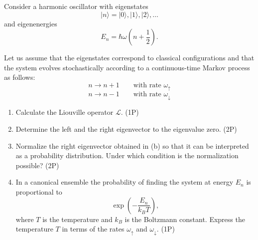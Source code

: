\begin{Problem}
	
	Consider a harmonic oscillator with eigenstates
	\[
	|n\rangle = |0\rangle, |1\rangle, |2\rangle, \ldots
	\]
	and eigenenergies
	\[
	E_n = \hbar \omega \left(n+\frac12\right).
	\]
	
	Let us assume that the eigenstates correspond to classical configurations and that
	the system evolves stochastically according to a continuous-time Markov process as follows:
	\[
	n \to n+1 \qquad \text{with rate } \omega_\uparrow
	\]
	\[
	n \to n-1 \qquad \text{with rate } \omega_\downarrow
	\]
	
	\begin{enumerate}[label=(\alph*)]
		\item Calculate the Liouville operator $\mathcal{L}$. \hfill (1P)
		
		\item Determine the left and the right eigenvector to the eigenvalue zero. \hfill (2P)
		
		\item Normalize the right eigenvector obtained in (b) so that it can be interpreted
		as a probability distribution. Under which condition is the normalization possible?
		\hfill (2P)
		
		\item In a canonical ensemble the probability of finding the system at energy $E_n$
		is proportional to
		\[
		\exp\!\left(-\frac{E_n}{k_B T}\right),
		\]
		where $T$ is the temperature and $k_B$ is the Boltzmann constant.
		Express the temperature $T$ in terms of the rates
		$\omega_\uparrow$ and $\omega_\downarrow$. \hfill (1P)
	\end{enumerate}
\end{Problem}
